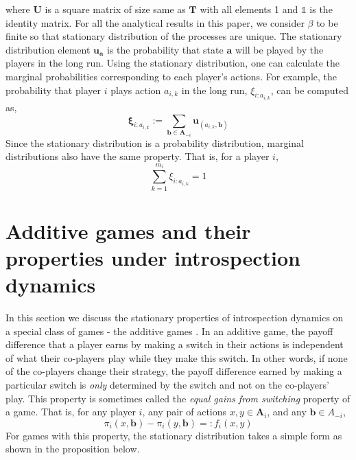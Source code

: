 \documentclass[11pt]{article}
\theoremstyle{plainCl1}
\theoremstyle{plainCl2}
\newcommand{\A}{\mathbf{A}}
\newcommand{\abf}{\mathbf{a}}
\newcommand{\bbf}{\mathbf{b}}
\newcommand{\T}{\mathbf{T}}
\newcommand{\ubf}{\mathbf{u}}
\begin{document}
where $\mathbf{U}$ is a square matrix of size same as $\T$ with all elements 1 and $\mathbb{1}$ is the identity matrix. For all the analytical results in this paper, we consider $\beta$ to be finite so that stationary distribution of the processes are unique. The stationary distribution element $\ubf_\abf$ is the probability that state $\abf$ will be played by the players in the long run. Using the stationary distribution, one can calculate the marginal probabilities corresponding to each player's actions. For example, the probability that player $i$ plays action $a_{i,k}$ in the long run, $\xi_{i:a_{i,k}}$, can be computed as,
\begin{equation}
\mathbf{\xi}_{i:a_{i,k}} := \sum_{\mathbf{b} \in \A_{-i}} \ubf_{(a_{i,k}, \bbf)}
\label{Eq:marginal-definition}
\end{equation}
\noindent Since the stationary distribution is a probability distribution, marginal distributions also have the same property. That is, for a player $i$, 
\begin{equation}
\sum_{k = 1}^{m_i} \xi_{i:a_{i,k}}= 1
\label{Eq:marginal-prob-dist}
\end{equation}
\section*{Additive games and their properties under introspection dynamics}
In this section we discuss the stationary properties of introspection dynamics on a special class of games - the additive games \cite{pena2014gains, mcavoy2015asymmetric}. In an additive game, the payoff difference that a player earns by making a switch in their actions is independent of what their co-players play while they make this switch. In other words, if none of the co-players change their strategy, the payoff difference earned by making a particular switch is \emph{only} determined by the switch and not on the co-players' play. This property is sometimes called the \emph{equal gains from switching} \cite{pena2014gains} property of a game. That is, for any player $i$, any pair of actions $x,y \in \A_i$, and any $\bbf \in A_{-i}$,
\begin{equation}
\pi_i(x, \bbf) - \pi_i(y, \bbf) =: f_i(x,y) 
\end{equation}
\noindent For games with this property, the stationary distribution takes a simple form as shown in the proposition below.
\end{document}
